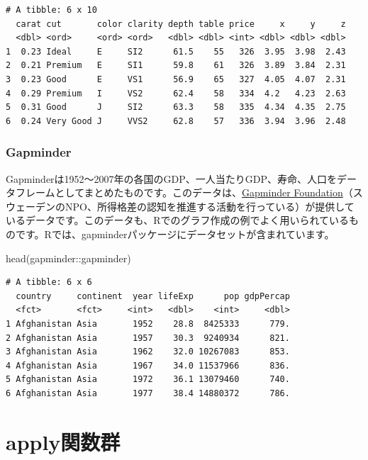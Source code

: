\documentclass[
  letterpaper,
  DIV=11,
  numbers=noendperiod]{scrreprt}
\newenvironment{Shaded}{\begin{snugshade}}{\end{snugshade}}
\newcommand{\FunctionTok}[1]{\textcolor[rgb]{0.28,0.35,0.67}{#1}}
\newcommand{\NormalTok}[1]{\textcolor[rgb]{0.00,0.23,0.31}{#1}}
\newcommand{\SpecialCharTok}[1]{\textcolor[rgb]{0.37,0.37,0.37}{#1}}
\begin{document}
\begin{verbatim}
# A tibble: 6 x 10
  carat cut       color clarity depth table price     x     y     z
  <dbl> <ord>     <ord> <ord>   <dbl> <dbl> <int> <dbl> <dbl> <dbl>
1  0.23 Ideal     E     SI2      61.5    55   326  3.95  3.98  2.43
2  0.21 Premium   E     SI1      59.8    61   326  3.89  3.84  2.31
3  0.23 Good      E     VS1      56.9    65   327  4.05  4.07  2.31
4  0.29 Premium   I     VS2      62.4    58   334  4.2   4.23  2.63
5  0.31 Good      J     SI2      63.3    58   335  4.34  4.35  2.75
6  0.24 Very Good J     VVS2     62.8    57   336  3.94  3.96  2.48
\end{verbatim}

\hypertarget{gapminder}{%
\subsection{Gapminder}\label{gapminder}}

Gapminderは1952～2007年の各国のGDP、一人当たりGDP、寿命、人口をデータフレームとしてまとめたものです。このデータは、\href{https://www.gapminder.org/}{Gapminder
Foundation}（スウェーデンのNPO、所得格差の認知を推進する活動を行っている）が提供しているデータです。このデータも、Rでのグラフ作成の例でよく用いられているものです。Rでは、gapminderパッケージにデータセットが含まれています。

\begin{Shaded}
\begin{Highlighting}[]
\FunctionTok{head}\NormalTok{(gapminder}\SpecialCharTok{::}\NormalTok{gapminder)}
\end{Highlighting}
\end{Shaded}

\begin{verbatim}
# A tibble: 6 x 6
  country     continent  year lifeExp      pop gdpPercap
  <fct>       <fct>     <int>   <dbl>    <int>     <dbl>
1 Afghanistan Asia       1952    28.8  8425333      779.
2 Afghanistan Asia       1957    30.3  9240934      821.
3 Afghanistan Asia       1962    32.0 10267083      853.
4 Afghanistan Asia       1967    34.0 11537966      836.
5 Afghanistan Asia       1972    36.1 13079460      740.
6 Afghanistan Asia       1977    38.4 14880372      786.
\end{verbatim}


\hypertarget{applyux95a2ux6570ux7fa4}{%
\chapter{apply関数群}\label{applyux95a2ux6570ux7fa4}}
\end{document}
